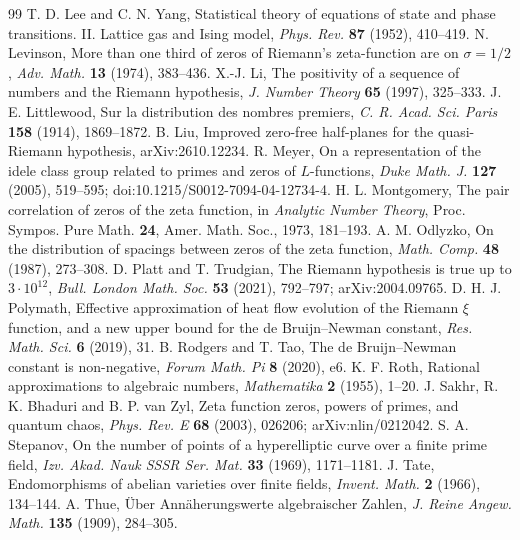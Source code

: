 \documentclass[11pt,a4paper]{article}
\theoremstyle{definition}\newtheorem{definition}[proposition]{Definition}
\theoremstyle{remark}\newtheorem{remark}[proposition]{Remark}
\begin{document}
\begin{thebibliography}{99}
 T. D. Lee and C. N. Yang, Statistical theory of equations of state and phase transitions. II. Lattice gas and Ising model, \emph{Phys. Rev.} \textbf{87} (1952), 410--419.
 N. Levinson, More than one third of zeros of Riemann's zeta-function are on $\sigma=1/2$, \emph{Adv. Math.} \textbf{13} (1974), 383--436.
 X.-J. Li, The positivity of a sequence of numbers and the Riemann hypothesis, \emph{J. Number Theory} \textbf{65} (1997), 325--333.
 J. E. Littlewood, Sur la distribution des nombres premiers, \emph{C. R. Acad. Sci. Paris} \textbf{158} (1914), 1869--1872.
 B. Liu, Improved zero-free half-planes for the quasi-Riemann hypothesis, arXiv:2610.12234.
 R. Meyer, On a representation of the idele class group related to primes and zeros of $L$-functions, \emph{Duke Math. J.} \textbf{127} (2005), 519--595; doi:10.1215/S0012-7094-04-12734-4.
 H. L. Montgomery, The pair correlation of zeros of the zeta function, in \emph{Analytic Number Theory}, Proc. Sympos. Pure Math. \textbf{24}, Amer. Math. Soc., 1973, 181--193.
 A. M. Odlyzko, On the distribution of spacings between zeros of the zeta function, \emph{Math. Comp.} \textbf{48} (1987), 273--308.
 D. Platt and T. Trudgian, The Riemann hypothesis is true up to $3\cdot10^{12}$, \emph{Bull. London Math. Soc.} \textbf{53} (2021), 792--797; arXiv:2004.09765.
 D. H. J. Polymath, Effective approximation of heat flow evolution of the Riemann $\xi$ function, and a new upper bound for the de Bruijn--Newman constant, \emph{Res. Math. Sci.} \textbf{6} (2019), 31.
 B. Rodgers and T. Tao, The de Bruijn--Newman constant is non-negative, \emph{Forum Math. Pi} \textbf{8} (2020), e6.
 K. F. Roth, Rational approximations to algebraic numbers, \emph{Mathematika} \textbf{2} (1955), 1--20.
 J. Sakhr, R. K. Bhaduri and B. P. van Zyl, Zeta function zeros, powers of primes, and quantum chaos, \emph{Phys. Rev. E} \textbf{68} (2003), 026206; arXiv:nlin/0212042.
 S. A. Stepanov, On the number of points of a hyperelliptic curve over a finite prime field, \emph{Izv. Akad. Nauk SSSR Ser. Mat.} \textbf{33} (1969), 1171--1181.
 J. Tate, Endomorphisms of abelian varieties over finite fields, \emph{Invent. Math.} \textbf{2} (1966), 134--144.
 A. Thue, \"Uber Ann\"aherungswerte algebraischer Zahlen, \emph{J. Reine Angew. Math.} \textbf{135} (1909), 284--305.

\end{thebibliography}
\end{document}
